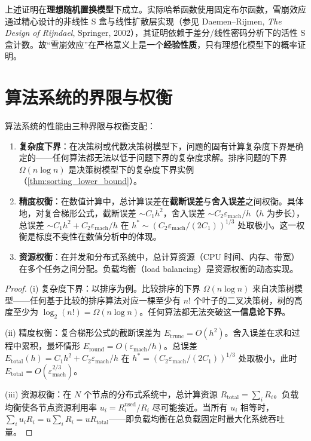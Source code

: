 \begin{remark}[雪崩效应的严格性]\label{rem:avalanche_rigor}
上述证明在\textbf{理想随机置换模型}下成立。实际哈希函数使用固定布尔函数，雪崩效应通过精心设计的非线性 S 盒与线性扩散层实现（参见 Daemen–Rijmen, \textit{The Design of Rijndael}, Springer, 2002），其证明依赖于差分/线性密码分析下的活性 S 盒计数。故“雪崩效应”在严格意义上是一个\textbf{经验性质}，只有理想化模型下的概率证明。
\end{remark}

\section{算法系统的界限与权衡}

\begin{theorem}[算法系统的三种界限与权衡]\label{thm:algorithm_conservation}
算法系统的性能由三种界限与权衡支配：
\begin{enumerate}[label=(\roman*)]
    \item \textbf{复杂度下界}：在决策树或代数决策树模型下，问题的固有计算复杂度下界是确定的——任何算法都无法以低于问题下界的复杂度求解。排序问题的下界 $\Omega(n \log n)$ 是决策树模型下的复杂度下界实例（\cref{thm:sorting_lower_bound}）。
    \item \textbf{精度权衡}：在数值计算中，总计算误差在\textbf{截断误差}与\textbf{舍入误差}之间权衡。具体地，对复合梯形公式，截断误差 $\sim C_1 h^2$，舍入误差 $\sim C_2 \varepsilon_{\text{mach}}/h$（$h$ 为步长），总误差 $\sim C_1 h^2 + C_2 \varepsilon_{\text{mach}}/h$ 在 $h^* \sim (C_2 \varepsilon_{\text{mach}}/(2 C_1))^{1/3}$ 处取极小。这一权衡是标度不变性在数值分析中的体现。
    \item \textbf{资源权衡}：在并发和分布式系统中，总计算资源（CPU 时间、内存、带宽）在多个任务之间分配。负载均衡（load balancing）是资源权衡的动态实现。
\end{enumerate}
\end{theorem}

\begin{proof}
(i) 复杂度下界：以排序为例。比较排序的下界 $\Omega(n \log n)$ 来自决策树模型——任何基于比较的排序算法对应一棵至少有 $n!$ 个叶子的二叉决策树，树的高度至少为 $\log_2(n!) = \Omega(n \log n)$。任何算法都无法突破这一\textbf{信息论下界}。

(ii) 精度权衡：复合梯形公式的截断误差为 $E_{\text{trunc}} = O(h^2)$。舍入误差在求和过程中累积，最坏情形 $E_{\text{round}} = O(\varepsilon_{\text{mach}}/h)$。总误差 $E_{\text{total}}(h) = C_1 h^2 + C_2 \varepsilon_{\text{mach}}/h$ 在 $h^* = (C_2 \varepsilon_{\text{mach}}/(2 C_1))^{1/3}$ 处取极小，此时 $E_{\text{total}} = O(\varepsilon_{\text{mach}}^{2/3})$。

(iii) 资源权衡：在 $N$ 个节点的分布式系统中，总计算资源 $R_{\text{total}} = \sum_i R_i$。负载均衡使各节点资源利用率 $u_i = R_i^{\text{used}}/R_i$ 尽可能接近。当所有 $u_i$ 相等时，$\sum_i u_i R_i = u \sum_i R_i = u R_{\text{total}}$——即负载均衡在总负载固定时最大化系统吞吐量。
\end{proof}

